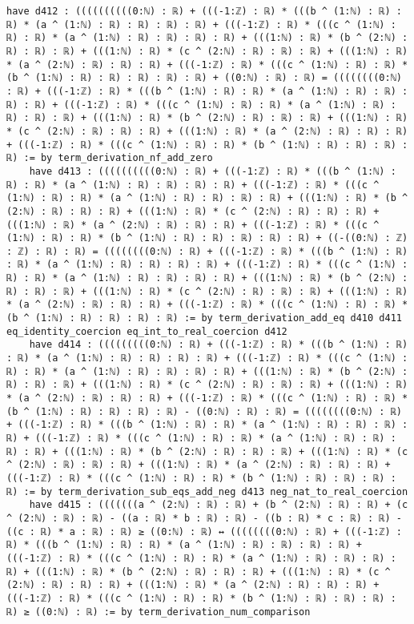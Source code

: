 \documentclass{article}
\begin{document}
\begin{tcolorbox}[colback=white!10, width=\linewidth]
\begin{lstlisting}[language=Lean4]
    have d412 : ((((((((((0:ℕ) : ℝ) + (((-1:ℤ) : ℝ) * (((b ^ (1:ℕ) : ℝ) : ℝ) * (a ^ (1:ℕ) : ℝ) : ℝ) : ℝ) : ℝ) + (((-1:ℤ) : ℝ) * (((c ^ (1:ℕ) : ℝ) : ℝ) * (a ^ (1:ℕ) : ℝ) : ℝ) : ℝ) : ℝ) + (((1:ℕ) : ℝ) * (b ^ (2:ℕ) : ℝ) : ℝ) : ℝ) + (((1:ℕ) : ℝ) * (c ^ (2:ℕ) : ℝ) : ℝ) : ℝ) + (((1:ℕ) : ℝ) * (a ^ (2:ℕ) : ℝ) : ℝ) : ℝ) + (((-1:ℤ) : ℝ) * (((c ^ (1:ℕ) : ℝ) : ℝ) * (b ^ (1:ℕ) : ℝ) : ℝ) : ℝ) : ℝ) : ℝ) + ((0:ℕ) : ℝ) : ℝ) = ((((((((0:ℕ) : ℝ) + (((-1:ℤ) : ℝ) * (((b ^ (1:ℕ) : ℝ) : ℝ) * (a ^ (1:ℕ) : ℝ) : ℝ) : ℝ) : ℝ) + (((-1:ℤ) : ℝ) * (((c ^ (1:ℕ) : ℝ) : ℝ) * (a ^ (1:ℕ) : ℝ) : ℝ) : ℝ) : ℝ) + (((1:ℕ) : ℝ) * (b ^ (2:ℕ) : ℝ) : ℝ) : ℝ) + (((1:ℕ) : ℝ) * (c ^ (2:ℕ) : ℝ) : ℝ) : ℝ) + (((1:ℕ) : ℝ) * (a ^ (2:ℕ) : ℝ) : ℝ) : ℝ) + (((-1:ℤ) : ℝ) * (((c ^ (1:ℕ) : ℝ) : ℝ) * (b ^ (1:ℕ) : ℝ) : ℝ) : ℝ) : ℝ) := by term_derivation_nf_add_zero
    have d413 : ((((((((((0:ℕ) : ℝ) + (((-1:ℤ) : ℝ) * (((b ^ (1:ℕ) : ℝ) : ℝ) * (a ^ (1:ℕ) : ℝ) : ℝ) : ℝ) : ℝ) + (((-1:ℤ) : ℝ) * (((c ^ (1:ℕ) : ℝ) : ℝ) * (a ^ (1:ℕ) : ℝ) : ℝ) : ℝ) : ℝ) + (((1:ℕ) : ℝ) * (b ^ (2:ℕ) : ℝ) : ℝ) : ℝ) + (((1:ℕ) : ℝ) * (c ^ (2:ℕ) : ℝ) : ℝ) : ℝ) + (((1:ℕ) : ℝ) * (a ^ (2:ℕ) : ℝ) : ℝ) : ℝ) + (((-1:ℤ) : ℝ) * (((c ^ (1:ℕ) : ℝ) : ℝ) * (b ^ (1:ℕ) : ℝ) : ℝ) : ℝ) : ℝ) : ℝ) + ((-((0:ℕ) : ℤ) : ℤ) : ℝ) : ℝ) = ((((((((0:ℕ) : ℝ) + (((-1:ℤ) : ℝ) * (((b ^ (1:ℕ) : ℝ) : ℝ) * (a ^ (1:ℕ) : ℝ) : ℝ) : ℝ) : ℝ) + (((-1:ℤ) : ℝ) * (((c ^ (1:ℕ) : ℝ) : ℝ) * (a ^ (1:ℕ) : ℝ) : ℝ) : ℝ) : ℝ) + (((1:ℕ) : ℝ) * (b ^ (2:ℕ) : ℝ) : ℝ) : ℝ) + (((1:ℕ) : ℝ) * (c ^ (2:ℕ) : ℝ) : ℝ) : ℝ) + (((1:ℕ) : ℝ) * (a ^ (2:ℕ) : ℝ) : ℝ) : ℝ) + (((-1:ℤ) : ℝ) * (((c ^ (1:ℕ) : ℝ) : ℝ) * (b ^ (1:ℕ) : ℝ) : ℝ) : ℝ) : ℝ) := by term_derivation_add_eq d410 d411 eq_identity_coercion eq_int_to_real_coercion d412
    have d414 : (((((((((0:ℕ) : ℝ) + (((-1:ℤ) : ℝ) * (((b ^ (1:ℕ) : ℝ) : ℝ) * (a ^ (1:ℕ) : ℝ) : ℝ) : ℝ) : ℝ) + (((-1:ℤ) : ℝ) * (((c ^ (1:ℕ) : ℝ) : ℝ) * (a ^ (1:ℕ) : ℝ) : ℝ) : ℝ) : ℝ) + (((1:ℕ) : ℝ) * (b ^ (2:ℕ) : ℝ) : ℝ) : ℝ) + (((1:ℕ) : ℝ) * (c ^ (2:ℕ) : ℝ) : ℝ) : ℝ) + (((1:ℕ) : ℝ) * (a ^ (2:ℕ) : ℝ) : ℝ) : ℝ) + (((-1:ℤ) : ℝ) * (((c ^ (1:ℕ) : ℝ) : ℝ) * (b ^ (1:ℕ) : ℝ) : ℝ) : ℝ) : ℝ) - ((0:ℕ) : ℝ) : ℝ) = ((((((((0:ℕ) : ℝ) + (((-1:ℤ) : ℝ) * (((b ^ (1:ℕ) : ℝ) : ℝ) * (a ^ (1:ℕ) : ℝ) : ℝ) : ℝ) : ℝ) + (((-1:ℤ) : ℝ) * (((c ^ (1:ℕ) : ℝ) : ℝ) * (a ^ (1:ℕ) : ℝ) : ℝ) : ℝ) : ℝ) + (((1:ℕ) : ℝ) * (b ^ (2:ℕ) : ℝ) : ℝ) : ℝ) + (((1:ℕ) : ℝ) * (c ^ (2:ℕ) : ℝ) : ℝ) : ℝ) + (((1:ℕ) : ℝ) * (a ^ (2:ℕ) : ℝ) : ℝ) : ℝ) + (((-1:ℤ) : ℝ) * (((c ^ (1:ℕ) : ℝ) : ℝ) * (b ^ (1:ℕ) : ℝ) : ℝ) : ℝ) : ℝ) := by term_derivation_sub_eqs_add_neg d413 neg_nat_to_real_coercion
    have d415 : (((((((a ^ (2:ℕ) : ℝ) : ℝ) + (b ^ (2:ℕ) : ℝ) : ℝ) + (c ^ (2:ℕ) : ℝ) : ℝ) - ((a : ℝ) * b : ℝ) : ℝ) - ((b : ℝ) * c : ℝ) : ℝ) - ((c : ℝ) * a : ℝ) : ℝ) ≥ ((0:ℕ) : ℝ) ↔ ((((((((0:ℕ) : ℝ) + (((-1:ℤ) : ℝ) * (((b ^ (1:ℕ) : ℝ) : ℝ) * (a ^ (1:ℕ) : ℝ) : ℝ) : ℝ) : ℝ) + (((-1:ℤ) : ℝ) * (((c ^ (1:ℕ) : ℝ) : ℝ) * (a ^ (1:ℕ) : ℝ) : ℝ) : ℝ) : ℝ) + (((1:ℕ) : ℝ) * (b ^ (2:ℕ) : ℝ) : ℝ) : ℝ) + (((1:ℕ) : ℝ) * (c ^ (2:ℕ) : ℝ) : ℝ) : ℝ) + (((1:ℕ) : ℝ) * (a ^ (2:ℕ) : ℝ) : ℝ) : ℝ) + (((-1:ℤ) : ℝ) * (((c ^ (1:ℕ) : ℝ) : ℝ) * (b ^ (1:ℕ) : ℝ) : ℝ) : ℝ) : ℝ) ≥ ((0:ℕ) : ℝ) := by term_derivation_num_comparison

\end{lstlisting}
\end{tcolorbox}
\end{document}
